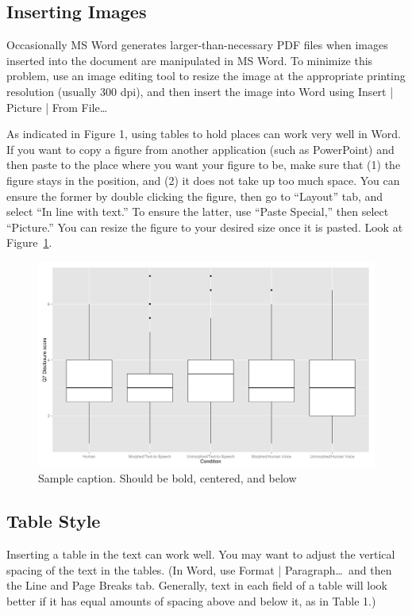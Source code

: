 \documentclass{icis}
\begin{document}
\subsection{Inserting Images}
Occasionally MS Word generates larger-than-necessary PDF files when images
inserted into the document are manipulated in MS Word. To minimize this
problem, use an image editing tool to resize the image at the appropriate
printing resolution (usually 300 dpi), and then insert the image into Word using
Insert | Picture | From File\ldots

As indicated in Figure 1, using tables to hold places can work very well in
Word. If you want to copy a figure from another application (such as PowerPoint)
and then paste to the place where you want your figure to be, make sure that (1)
the figure stays in the position, and (2) it does not take up too much
space. You can ensure the former by double clicking the figure, then go to
``Layout'' tab, and select ``In line with text.'' To ensure the latter, use ``Paste
Special,'' then select ``Picture.'' You can resize the figure to your desired size
once it is pasted. Look at Figure~\ref{fig:test}.

\begin{figure}[h]
  \centering
  \includegraphics[scale = 0.45]{testimage.png}
  \caption{Sample caption. Should be bold, centered, and below} 
  \label{fig:test}
\end{figure}


\subsection{Table Style}
Inserting a table in the text can work well. You may want to adjust the vertical
spacing of the text in the tables. (In Word, use Format | Paragraph\ldots~and then
the Line and Page Breaks tab. Generally, text in each field of a table will look
better if it has equal amounts of spacing above and below it, as in Table 1.)
\end{document}
